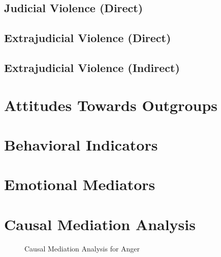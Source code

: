 \documentclass[]{article}
\begin{document}
\subsection{Judicial Violence (Direct)}



\subsection{Extrajudicial Violence (Direct)}



\subsection{Extrajudicial Violence (Indirect)}



{
\section{Attitudes Towards Outgroups}\vspace{-1em}

\vspace{-1.5em}

\section{Behavioral Indicators}\vspace{-1em}


}

\section{Emotional Mediators}



\section{Causal Mediation Analysis}

\usetikzlibrary{positioning}

\begin{figure}[H]
\caption{Causal Mediation Analysis for Anger}\vspace{.5em}
\centering
\vspace{2em}

\end{figure}
\end{document}
